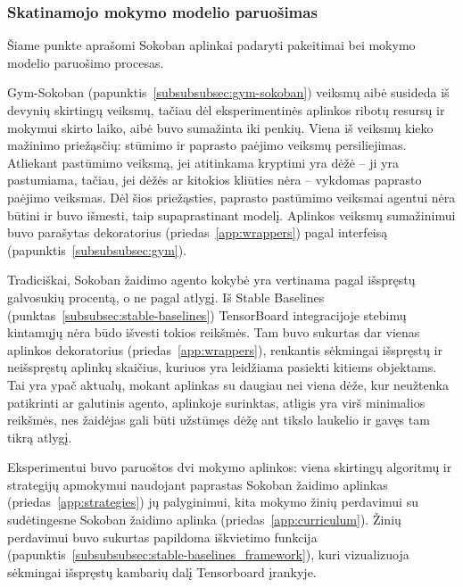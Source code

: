 \documentclass{VUMIFPSbakalaurinis}
\begin{document}
\subsubsection{Skatinamojo mokymo modelio paruošimas}
{
	Šiame punkte aprašomi Sokoban aplinkai padaryti pakeitimai bei mokymo modelio paruošimo procesas.
}
\label{subsubsubsec:sokoban_prepare}
{
	Gym-Sokoban (papunktis~\ref{subsubsubsec:gym-sokoban}) veiksmų aibė susideda iš devynių skirtingų veiksmų, tačiau dėl eksperimentinės aplinkos ribotų resursų ir mokymui skirto laiko, aibė buvo sumažinta iki penkių. Viena iš veiksmų kieko mažinimo priežąsčių: stūmimo ir paprasto paėjimo veiksmų persiliejimas. Atliekant pastūmimo veiksmą, jei atitinkama kryptimi yra dėžė -- ji yra pastumiama, tačiau, jei dėžės ar kitokios kliūties nėra -- vykdomas paprasto paėjimo veiksmas. Dėl šios priežąsties, paprasto pastūmimo veiksmai agentui nėra būtini ir buvo išmesti, taip supaprastinant modelį. Aplinkos veiksmų sumažinimui buvo parašytas dekoratorius (priedas~\ref{app:wrappers}) pagal  interfeisą (papunktis~\ref{subsubsubsec:gym}).\par
	
	Tradiciškai, Sokoban žaidimo agento kokybė yra vertinama pagal išspręstų galvosukių procentą, o ne pagal atlygį. Iš Stable Baselines (punktas~\ref{subsubsec:stable-baselines}) TensorBoard integracijoje stebimų kintamųjų nėra būdo išvesti tokios reikšmės. Tam buvo sukurtas dar vienas aplinkos dekoratorius (priedas~\ref{app:wrappers}), renkantis sėkmingai išspręstų ir neišspręstų aplinkų skaičius, kuriuos yra leidžiama pasiekti kitiems objektams. Tai yra ypač aktualų, mokant aplinkas su daugiau nei viena dėže, kur neužtenka patikrinti ar galutinis agento, aplinkoje surinktas, atligis yra virš minimalios reikšmės, nes žaidėjas gali būti užstūmęs dėžę ant tikslo laukelio ir gavęs tam tikrą atlygį. 
}
{
	Eksperimentui buvo paruoštos dvi mokymo aplinkos: viena skirtingų algoritmų ir strategijų apmokymui naudojant paprastas Sokoban žaidimo aplinkas (priedas~\ref{app:strategies}) jų palyginimui, kita mokymo žinių perdavimui su sudėtingesne Sokoban žaidimo aplinka (priedas~\ref{app:curriculum}). Žinių perdavimui buvo sukurtas papildoma iškvietimo funkcija (papunktis~\ref{subsubsubsec:stable-baselines_framework}), kuri vizualizuoja sėkmingai išspręstų kambarių dalį Tensorboard įrankyje.\par
}
\end{document}
